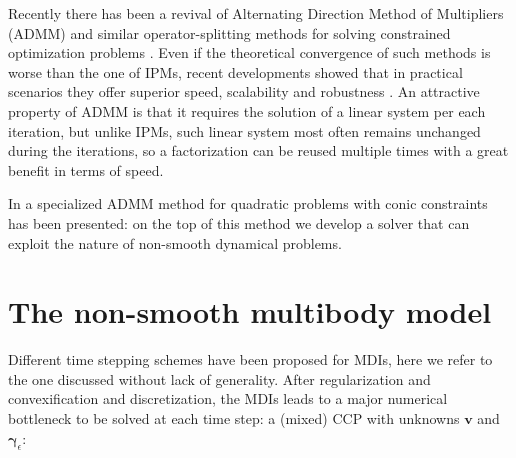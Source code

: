 \documentclass{svproc}
\newcommand{\vect}[1]{\bm{#1}}
\begin{document}
Recently there has been a revival of Alternating Direction Method of Multipliers (ADMM) and similar operator-splitting methods for solving constrained optimization problems
\cite{Goldstein2014}. %
Even if the theoretical convergence of such methods is worse than the one of IPMs, recent developments showed that in practical scenarios they offer superior speed, scalability and robustness 
\cite{Cannon2019}. %
An attractive property of ADMM is that it requires the solution of a linear system per each iteration, but unlike IPMs, such linear system most often remains unchanged during the iterations, so a factorization can be reused multiple times with a great benefit in terms of speed.

In 
\cite{Stellato2020} %
a specialized ADMM method for quadratic problems with conic constraints has been presented: on the top of this method we develop a solver that can exploit the nature of non-smooth dynamical problems. 




\section{The non-smooth multibody model}

Different time stepping schemes have been proposed for MDIs, here we refer to the one discussed \cite{TasoraAnitescuCMAME10} without lack of generality. After regularization and convexification and discretization, the MDIs leads to a major numerical bottleneck to be solved at each time step: a (mixed) CCP with unknowns $\vect{v}$ and $\vect{\gamma}_\epsilon$: 
\end{document}
